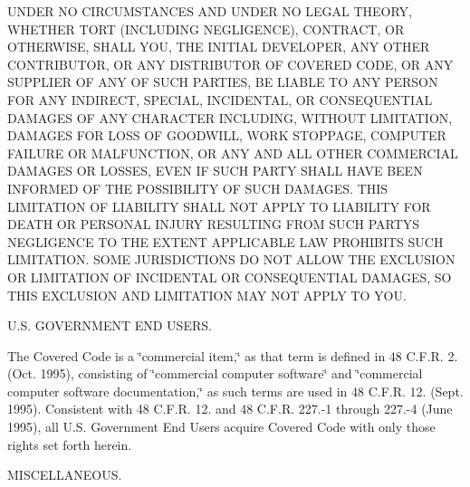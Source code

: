\begin{DoxyEnumerate}
U\+N\+D\+E\+R N\+O C\+I\+R\+C\+U\+M\+S\+T\+A\+N\+C\+E\+S A\+N\+D U\+N\+D\+E\+R N\+O L\+E\+G\+A\+L T\+H\+E\+O\+R\+Y, W\+H\+E\+T\+H\+E\+R T\+O\+R\+T (I\+N\+C\+L\+U\+D\+I\+N\+G N\+E\+G\+L\+I\+G\+E\+N\+C\+E), C\+O\+N\+T\+R\+A\+C\+T, O\+R O\+T\+H\+E\+R\+W\+I\+S\+E, S\+H\+A\+L\+L Y\+O\+U, T\+H\+E I\+N\+I\+T\+I\+A\+L D\+E\+V\+E\+L\+O\+P\+E\+R, A\+N\+Y O\+T\+H\+E\+R C\+O\+N\+T\+R\+I\+B\+U\+T\+O\+R, O\+R A\+N\+Y D\+I\+S\+T\+R\+I\+B\+U\+T\+O\+R O\+F C\+O\+V\+E\+R\+E\+D C\+O\+D\+E, O\+R A\+N\+Y S\+U\+P\+P\+L\+I\+E\+R O\+F A\+N\+Y O\+F S\+U\+C\+H P\+A\+R\+T\+I\+E\+S, B\+E L\+I\+A\+B\+L\+E T\+O A\+N\+Y P\+E\+R\+S\+O\+N F\+O\+R A\+N\+Y I\+N\+D\+I\+R\+E\+C\+T, S\+P\+E\+C\+I\+A\+L, I\+N\+C\+I\+D\+E\+N\+T\+A\+L, O\+R C\+O\+N\+S\+E\+Q\+U\+E\+N\+T\+I\+A\+L D\+A\+M\+A\+G\+E\+S O\+F A\+N\+Y C\+H\+A\+R\+A\+C\+T\+E\+R I\+N\+C\+L\+U\+D\+I\+N\+G, W\+I\+T\+H\+O\+U\+T L\+I\+M\+I\+T\+A\+T\+I\+O\+N, D\+A\+M\+A\+G\+E\+S F\+O\+R L\+O\+S\+S O\+F G\+O\+O\+D\+W\+I\+L\+L, W\+O\+R\+K S\+T\+O\+P\+P\+A\+G\+E, C\+O\+M\+P\+U\+T\+E\+R F\+A\+I\+L\+U\+R\+E O\+R M\+A\+L\+F\+U\+N\+C\+T\+I\+O\+N, O\+R A\+N\+Y A\+N\+D A\+L\+L O\+T\+H\+E\+R C\+O\+M\+M\+E\+R\+C\+I\+A\+L D\+A\+M\+A\+G\+E\+S O\+R L\+O\+S\+S\+E\+S, E\+V\+E\+N I\+F S\+U\+C\+H P\+A\+R\+T\+Y S\+H\+A\+L\+L H\+A\+V\+E B\+E\+E\+N I\+N\+F\+O\+R\+M\+E\+D O\+F T\+H\+E P\+O\+S\+S\+I\+B\+I\+L\+I\+T\+Y O\+F S\+U\+C\+H D\+A\+M\+A\+G\+E\+S. T\+H\+I\+S L\+I\+M\+I\+T\+A\+T\+I\+O\+N O\+F L\+I\+A\+B\+I\+L\+I\+T\+Y S\+H\+A\+L\+L N\+O\+T A\+P\+P\+L\+Y T\+O L\+I\+A\+B\+I\+L\+I\+T\+Y F\+O\+R D\+E\+A\+T\+H O\+R P\+E\+R\+S\+O\+N\+A\+L I\+N\+J\+U\+R\+Y R\+E\+S\+U\+L\+T\+I\+N\+G F\+R\+O\+M S\+U\+C\+H P\+A\+R\+T\+Y\textquotesingle{}S N\+E\+G\+L\+I\+G\+E\+N\+C\+E T\+O T\+H\+E E\+X\+T\+E\+N\+T A\+P\+P\+L\+I\+C\+A\+B\+L\+E L\+A\+W P\+R\+O\+H\+I\+B\+I\+T\+S S\+U\+C\+H L\+I\+M\+I\+T\+A\+T\+I\+O\+N. S\+O\+M\+E J\+U\+R\+I\+S\+D\+I\+C\+T\+I\+O\+N\+S D\+O N\+O\+T A\+L\+L\+O\+W T\+H\+E E\+X\+C\+L\+U\+S\+I\+O\+N O\+R L\+I\+M\+I\+T\+A\+T\+I\+O\+N O\+F I\+N\+C\+I\+D\+E\+N\+T\+A\+L O\+R C\+O\+N\+S\+E\+Q\+U\+E\+N\+T\+I\+A\+L D\+A\+M\+A\+G\+E\+S, S\+O T\+H\+I\+S E\+X\+C\+L\+U\+S\+I\+O\+N A\+N\+D L\+I\+M\+I\+T\+A\+T\+I\+O\+N M\+A\+Y N\+O\+T A\+P\+P\+L\+Y T\+O Y\+O\+U.
\item U.\+S. G\+O\+V\+E\+R\+N\+M\+E\+N\+T E\+N\+D U\+S\+E\+R\+S.

The Covered Code is a \char`\"{}commercial item,\char`\"{} as that term is defined in 48 C.\+F.\+R. 2. (Oct. 1995), consisting of \char`\"{}commercial computer
     software\char`\"{} and \char`\"{}commercial computer software documentation,\char`\"{} as such terms are used in 48 C.\+F.\+R. 12. (Sept. 1995). Consistent with 48 C.\+F.\+R. 12. and 48 C.\+F.\+R. 227.-\/1 through 227.-\/4 (June 1995), all U.\+S. Government End Users acquire Covered Code with only those rights set forth herein.
\item M\+I\+S\+C\+E\+L\+L\+A\+N\+E\+O\+U\+S.


\end{DoxyEnumerate}
